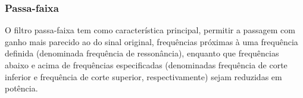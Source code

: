     \subsubsection{Passa-faixa}
      O filtro passa-faixa tem como característica principal, permitir a passagem com
      ganho mais parecido ao do sinal original, frequências próximas à uma frequência definida (denominada frequência de ressonância), enquanto que frequências abaixo e acima de frequências especificadas (denominadas frequência de corte inferior e frequência de corte superior, respectivamente) sejam reduzidas em potência.
